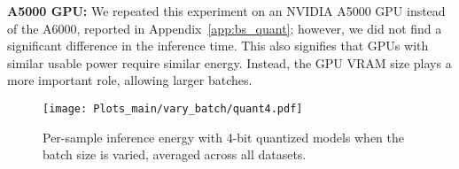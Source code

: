%


\vspace{2mm}
\noindent \textbf{A5000 GPU:}
We repeated this experiment on an NVIDIA A5000 GPU instead of the A6000, reported in Appendix~\ref{app:bs_quant}; however, we did not find a significant difference in the inference time. 
This also signifies that GPUs with similar usable power require similar energy. Instead, the GPU VRAM size plays a more important role, allowing larger batches.






\begin{figure}[!t]
\centering
{\texttt{[image: Plots\_main/vary\_batch/quant4.pdf]}\label{fig:vary-batch-quantized}}
\caption{Per-sample inference energy with 4-bit quantized models when the batch size is varied, averaged across all datasets. 
}
\label{fig:vary-batch-quant4}
\end{figure}





